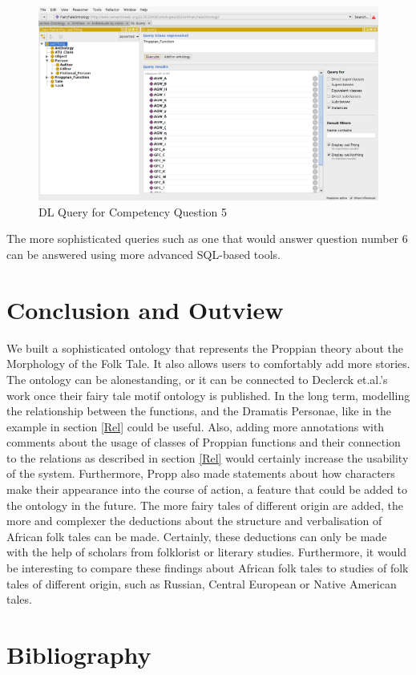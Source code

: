 \documentclass[10pt,a4paper]{article}
\begin{document}
\begin{figure} [H]
\centering
 	\includegraphics[scale=0.2]{Screen8.png}
 	\caption{DL Query for Competency Question 5}
\end{figure}

The more sophisticated queries such as one that would answer question number 6 can be answered using more advanced SQL-based tools. 

\newpage
\section{Conclusion and Outview}
We built a sophisticated ontology that represents the Proppian theory about the Morphology of the Folk Tale.\cite{propp1968} It also allows users to comfortably add more stories. The ontology can be alonestanding, or it can be connected to Declerck et.al.'s \cite{Declerck2017} work once their fairy tale motif ontology is published. In the long term, modelling the relationship between the functions, and the Dramatis Personae, like in the example in section \ref{Rel} could be useful. Also, adding more annotations with comments about the usage of classes of Proppian functions and their connection to the relations as described in section \ref{Rel} would certainly increase the usability of the system. Furthermore, Propp also made statements about how characters make their appearance into the course of action, a feature that could be added to the ontology in the future. 
 The more fairy tales of different origin are added, the more and complexer the deductions about the structure and verbalisation of African folk tales can be made. Certainly, these deductions can only be made with the help of scholars from folklorist or literary studies. Furthermore, it would be interesting to compare these findings about African folk tales to studies of folk tales of different origin, such as Russian, Central European or Native American tales. 
\newpage
    
\section{Bibliography}

 

\end{document}
